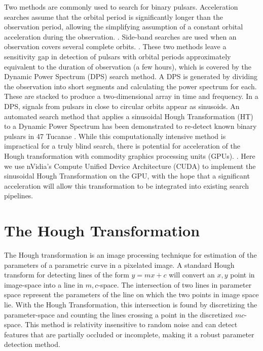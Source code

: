 Two methods are commonly used to search for binary pulsars.
Acceleration searches assume that the orbital period is significantly longer than the observation period, allowing the simplifying assumption of a constant orbital acceleration during the observation. \citep{camilo2000observations,ransom2002fourier, Ransom2001a}.
Side-band searches are used when an observation covers several complete orbits. \citep{Jouteux2002a, Ransom2003}.
These two methods leave a sensitivity gap in detection of pulsars with orbital periods approximately equivalent to the duration of observation (a few hours), which is covered by the Dynamic Power Spectrum (DPS) search method.
A DPS is generated by dividing the observation into short segments and calculating the power spectrum for each.
These are stacked to produce a two-dimensional array in time and frequency. In a DPS, signals from pulsars in close to circular orbits appear as sinusoids.
An automated search method that applies a sinusoidal Hough Transformation (HT) to a Dynamic Power Spectrum has been demonstrated to re-detect known binary pulsars in 47 Tucanae \citep{aulbert2005finding, aulbert2007finding}.
While this computationally intensive method is impractical for a truly blind search, there is potential for acceleration of the Hough transformation with commodity graphics processing units (GPUs). \citep{aulbert2005finding}.
Here we use nVidia's Compute Unified Device Architecture (CUDA) to implement the sinusoidal Hough Transformation on the GPU, with the hope that a significant acceleration will allow this transformation to be integrated into existing search pipelines.

\section{The Hough Transformation}

The Hough transformation is an image processing technique for estimation of the parameters of a parametric curve in a pixelated image.
A standard Hough transform for detecting lines of the form $y=mx+c$ will convert an $x,y$ point in image-space into a line in $m,c$-space.
The intersection of two lines in parameter space represent the parameters of the line on which the two points in image space lie.
With the Hough Transformation, this intersection is found by discretizing the parameter-space and counting the lines crossing a point in the discretized $mc$-space.
This method is relativity insensitive to random noise and can detect features that are partially occluded or incomplete, making it a robust parameter detection method.

